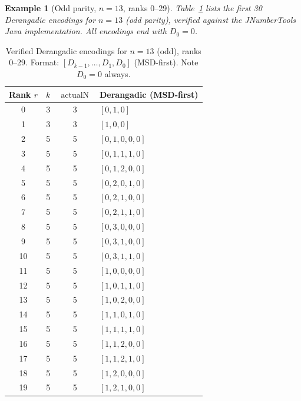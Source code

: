 \documentclass[11pt,a4paper]{article}
\newtheorem{example}{Example}[section]
\newcommand{\actualN}{\operatorname{actualN}}
\begin{document}
    \begin{example}[Odd parity, $n=13$, ranks 0--29]
        \label{ex:n13-verified}
        Table~\ref{tab:n13-verified} lists the first 30 Derangadic encodings for
        $n=13$ (odd parity), verified against the JNumberTools Java implementation.
        All encodings end with $D_0 = 0$.
    \end{example}

    \begin{table}[h]
        \centering
        \caption{Verified Derangadic encodings for $n=13$ (odd), ranks 0--29.
        Format: $[D_{k-1},\dots,D_1,D_0]$ (MSD-first). Note $D_0=0$ always.}
        \label{tab:n13-verified}
        \begin{tabular}{cccl}
            \toprule
            Rank $r$ & $k$ & $\actualN$ & Derangadic (MSD-first) \\
            \midrule
            0 & 3 & 3 & $[0, 1, 0]$ \\
            1 & 3 & 3 & $[1, 0, 0]$ \\
            2 & 5 & 5 & $[0, 1, 0, 0, 0]$ \\
            3 & 5 & 5 & $[0, 1, 1, 1, 0]$ \\
            4 & 5 & 5 & $[0, 1, 2, 0, 0]$ \\
            5 & 5 & 5 & $[0, 2, 0, 1, 0]$ \\
            6 & 5 & 5 & $[0, 2, 1, 0, 0]$ \\
            7 & 5 & 5 & $[0, 2, 1, 1, 0]$ \\
            8 & 5 & 5 & $[0, 3, 0, 0, 0]$ \\
            9 & 5 & 5 & $[0, 3, 1, 0, 0]$ \\
            10 & 5 & 5 & $[0, 3, 1, 1, 0]$ \\
            11 & 5 & 5 & $[1, 0, 0, 0, 0]$ \\
            12 & 5 & 5 & $[1, 0, 1, 1, 0]$ \\
            13 & 5 & 5 & $[1, 0, 2, 0, 0]$ \\
            14 & 5 & 5 & $[1, 1, 0, 1, 0]$ \\
            15 & 5 & 5 & $[1, 1, 1, 1, 0]$ \\
            16 & 5 & 5 & $[1, 1, 2, 0, 0]$ \\
            17 & 5 & 5 & $[1, 1, 2, 1, 0]$ \\
            18 & 5 & 5 & $[1, 2, 0, 0, 0]$ \\
            19 & 5 & 5 & $[1, 2, 1, 0, 0]$ \\

\end{tabular}
\end{table}
\end{document}
